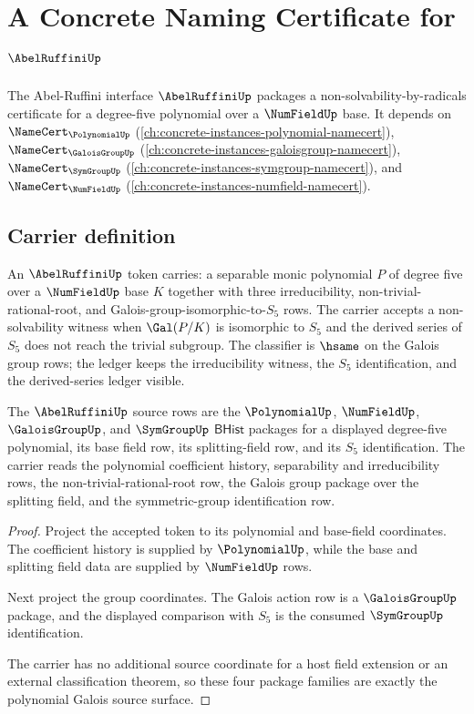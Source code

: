 \chapter{A Concrete Naming Certificate for $\AbelRuffiniUp$}
\label{ch:concrete-instances-abelruffini-namecert}

The Abel-Ruffini interface $\AbelRuffiniUp$ packages a non-solvability-by-radicals certificate for a degree-five polynomial over a $\NumFieldUp$ base. It depends on $\NameCert_{\PolynomialUp}$ (\autoref{ch:concrete-instances-polynomial-namecert}), $\NameCert_{\GaloisGroupUp}$ (\autoref{ch:concrete-instances-galoisgroup-namecert}), $\NameCert_{\SymGroupUp}$ (\autoref{ch:concrete-instances-symgroup-namecert}), and $\NameCert_{\NumFieldUp}$ (\autoref{ch:concrete-instances-numfield-namecert}).

\section{Carrier definition}
\label{sec:abelruffini-carrier}

An $\AbelRuffiniUp$ token carries: a separable monic polynomial $P$ of degree five over a $\NumFieldUp$ base $K$ together with three irreducibility, non-trivial-rational-root, and Galois-group-isomorphic-to-$S_5$ rows. The carrier accepts a non-solvability witness when $\Gal(P/K)$ is isomorphic to $S_5$ and the derived series of $S_5$ does not reach the trivial subgroup. The classifier is $\hsame$ on the Galois group rows; the ledger keeps the irreducibility witness, the $S_5$ identification, and the derived-series ledger visible.

\begin{theorem}
\label{thm:abelruffini-polynomial-galois-obligation}
The $\AbelRuffiniUp$ source rows are the $\PolynomialUp$, $\NumFieldUp$,
$\GaloisGroupUp$, and $\SymGroupUp$ $\mathsf{BHist}$ packages for a displayed
degree-five polynomial, its base field row, its splitting-field row, and its
$S_5$ identification. The carrier reads the polynomial coefficient history,
separability and irreducibility rows, the non-trivial-rational-root row, the
Galois group package over the splitting field, and the symmetric-group
identification row.
\end{theorem}
\begin{proof}
Project the accepted token to its polynomial and base-field coordinates. The
coefficient history is supplied by $\PolynomialUp$, while the base and splitting
field data are supplied by $\NumFieldUp$ rows.

Next project the group coordinates. The Galois action row is a
$\GaloisGroupUp$ package, and the displayed comparison with $S_5$ is the
consumed $\SymGroupUp$ identification.

The carrier has no additional source coordinate for a host field extension or an
external classification theorem, so these four package families are exactly the
polynomial Galois source surface.
\end{proof}

